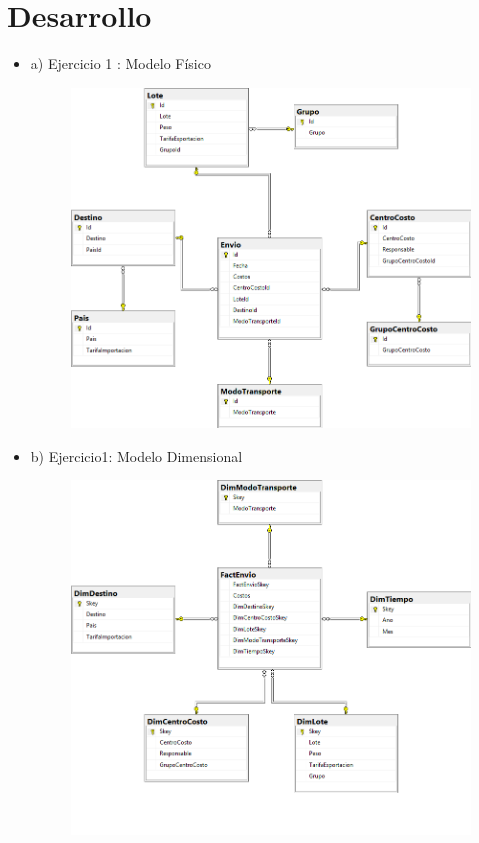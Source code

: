 \section{Desarrollo} 
\begin{itemize}

	\item a) Ejercicio 1 : Modelo Físico
		\begin{figure}[H]
		\begin{center}
		\includegraphics[width=18cm]{./Imagenes/imagen1}
		\end{center}
		\end{figure}

     	\item b) Ejercicio1: Modelo Dimensional
		\begin{figure}[H]
		\begin{center}
		\includegraphics[width=18cm]{./Imagenes/imagen2}
		\end{center}
		\end{figure}
     


\end{itemize}
